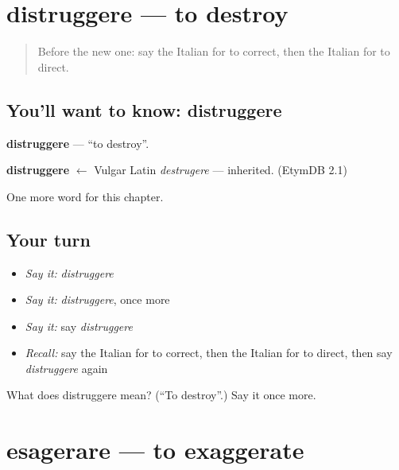 \section[distruggere]{distruggere — to destroy}

\label{lesson:IT-C241-distruggere}



\begin{quote}
Before the new one: say the Italian for to correct, then the Italian for to direct.
\end{quote}

\subsection*{You'll want to know: distruggere}
\textbf{distruggere} — \textquotedblleft{}to destroy\textquotedblright{}.

\begin{cousinweb}
\textbf{distruggere} $\leftarrow$ Vulgar Latin \emph{destrugere} — inherited. (EtymDB 2.1)
\end{cousinweb}

\begin{grammarlens}[title={What you've built}]
One more word for this chapter.
\end{grammarlens}

\subsection*{Your turn}
\begin{itemize}
\raggedright
  \item \emph{Say it:} \emph{distruggere}
  \item \emph{Say it:} \emph{distruggere}, once more
  \item \emph{Say it:} say \emph{distruggere}
  \item \emph{Recall:} say the Italian for to correct, then the Italian for to direct, then say \emph{distruggere} again
\end{itemize}

\begin{tcolorbox}[breakable,colback=teal!4,colframe=teal!35!black,title={Before you move on}]
What does distruggere mean? (\textquotedblleft{}To destroy\textquotedblright{}.) Say it once more.
\end{tcolorbox}
\section[esagerare]{esagerare — to exaggerate}

